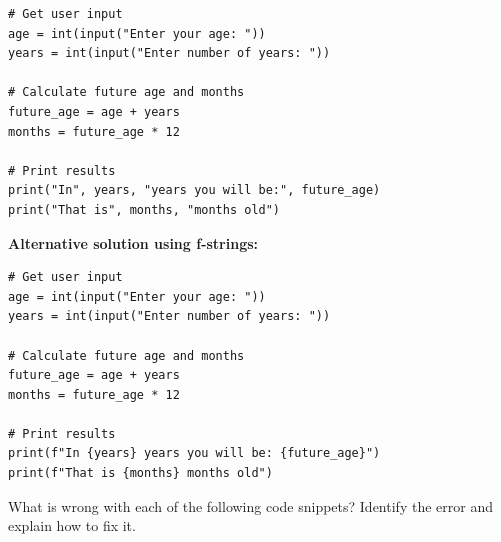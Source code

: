 \documentclass{csexam}
\begin{document}
\begin{questions}
\begin{solution}
\begin{lstlisting}
# Get user input
age = int(input("Enter your age: "))
years = int(input("Enter number of years: "))

# Calculate future age and months
future_age = age + years
months = future_age * 12

# Print results
print("In", years, "years you will be:", future_age)
print("That is", months, "months old")
\end{lstlisting}

\textbf{Alternative solution using f-strings:}
\begin{lstlisting}
# Get user input
age = int(input("Enter your age: "))
years = int(input("Enter number of years: "))

# Calculate future age and months
future_age = age + years
months = future_age * 12

# Print results
print(f"In {years} years you will be: {future_age}")
print(f"That is {months} months old")
\end{lstlisting}
\end{solution}

\newpage

\question[8] What is wrong with each of the following code snippets? Identify the error and explain how to fix it.

\begin{solution}
\end{solution}
\end{questions}
\end{document}
